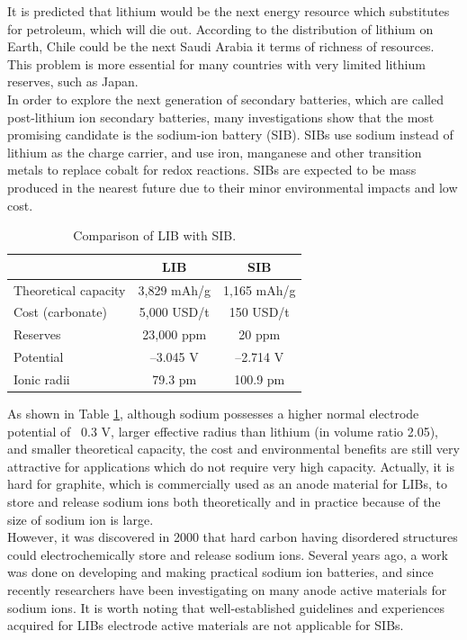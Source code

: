 It is predicted that lithium would be the next energy resource which substitutes for petroleum, which will die out.\cite{Jaskula2016} According to the distribution of lithium on Earth\cite{Jaskula2011}, Chile could be the next Saudi Arabia it terms of richness of resources. This problem is more essential for many countries with very limited lithium reserves, such as Japan. \\
In order to explore the next generation of secondary batteries, which are called post-lithium ion secondary batteries, many investigations
show that the most promising candidate is the sodium-ion battery (SIB). SIBs use sodium instead of lithium as the charge carrier, and use iron, manganese and other transition metals to replace cobalt for redox reactions. SIBs are expected to be mass produced in the nearest future due to their minor environmental impacts and low cost.

\begin{table}[ht]
\centering %
\begin{tabular}{|l|c|c|} %
\hline %
 & LIB & SIB\\ [0.5ex] %
\hline %
Theoretical capacity & 3,829 mAh/g & 1,165 mAh/g \\[1.5ex] %
Cost (carbonate) & 5,000 USD/t & 150 USD/t \\[1.5ex]%
Reserves & 23,000 ppm & 20 ppm \\[1.5ex]
Potential & –3.045 V & –2.714 V \\[1.5ex]
Ionic radii & 79.3 pm & 100.9 pm \\[1.5ex]
\hline %
\end{tabular}
\caption{Comparison of LIB with SIB.} %
\label{table1.1} %
\end{table}

As shown in Table \ref{table1.1}, although sodium possesses a higher normal electrode potential of ~0.3 V, larger effective radius than lithium (in volume ratio 2.05), and smaller theoretical capacity, the cost and environmental benefits are still very attractive for applications which do not require very high capacity. Actually, it is hard for graphite, which is commercially used as an anode material for LIBs, to store and release sodium ions both theoretically and in practice because of the size of sodium ion is large. \\
However, it was discovered in 2000 that hard carbon having disordered structures could electrochemically store and release sodium ions.\cite{Stevens2000} Several years ago, a work was done on developing and making practical sodium ion batteries, and since recently researchers have been investigating on many anode active materials for sodium ions. It is worth noting that well-established guidelines and experiences acquired for LIBs electrode active materials are not applicable for SIBs.\cite{Lang2010,Armand2008,KUZE2013}

